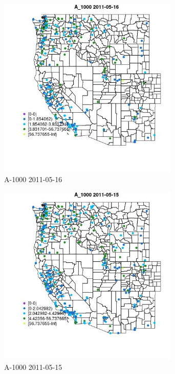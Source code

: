 \begin{figure} 
\centering  
\includegraphics[width=0.77\textwidth]{Code_Outputs/ML_input_report_ML_input_PM25_Step5_part_d_de_duplicated_aves_ML_input_MapObsA_10002011-05-16.jpg} 
\caption{\label{fig:ML_input_report_ML_input_PM25_Step5_part_d_de_duplicated_aves_ML_inputMapObsA_10002011-05-16}A-1000 2011-05-16} 
\end{figure} 
 

\begin{figure} 
\centering  
\includegraphics[width=0.77\textwidth]{Code_Outputs/ML_input_report_ML_input_PM25_Step5_part_d_de_duplicated_aves_ML_input_MapObsA_10002011-05-15.jpg} 
\caption{\label{fig:ML_input_report_ML_input_PM25_Step5_part_d_de_duplicated_aves_ML_inputMapObsA_10002011-05-15}A-1000 2011-05-15} 
\end{figure} 
 

